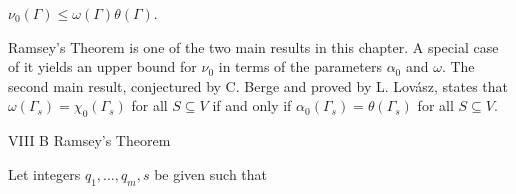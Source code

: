 $\nu_0(\Gamma) \leq \omega(\Gamma)\theta(\Gamma)$.

Ramsey's Theorem is one of the two main results in this chapter. A special case of it yields an upper bound for $\nu_0$ in terms of the parameters $\alpha_0$ and $\omega$. The second main result, conjectured by C. Berge and proved by L. Lovász, states that $\omega(\Gamma_s) = \chi_0(\Gamma_s)$ for all $S \subseteq V$ if and only if $\alpha_0(\Gamma_s) = \theta(\Gamma_s)$ for all $S \subseteq V$.

VIII B Ramsey's Theorem

Let integers $q_1, \ldots, q_m, s$ be given such that
